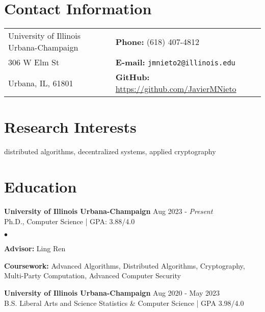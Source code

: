 \documentclass[margin,line]{res}
\newenvironment{list1}{
  \begin{list}{\ding{113}}{%
      \setlength{\itemsep}{0in}
      \setlength{\parsep}{0in} \setlength{\parskip}{0in}
      \setlength{\topsep}{0in} \setlength{\partopsep}{0in} 
      \setlength{\leftmargin}{0.17in}}}{\end{list}}
\newenvironment{list2}{
  \begin{list}{$\bullet$}{%
      \setlength{\itemsep}{0in}
      \setlength{\parsep}{0in} \setlength{\parskip}{0in}
      \setlength{\topsep}{0in} \setlength{\partopsep}{0in} 
      \setlength{\leftmargin}{0.2in}}}{\end{list}}
\begin{document}

\begin{resume}
  \section{\sc Contact Information}
  \vspace{.05in}
  \begin{tabular}{@{}p{3in}p{4in}}
    University of Illinois Urbana-Champaign & {\bf Phone:}   (618) 407-4812                       \\
    306 W Elm St                            & {\bf E-mail:}  {\tt jmnieto2@illinois.edu}          \\
    Urbana, IL, 61801                       & {\bf GitHub:} \url{https://github.com/JavierMNieto} \\
  \end{tabular}


  \section{\sc Research Interests}
  distributed algorithms, decentralized systems, applied cryptography

  \section{\sc Education}
   {\bf University of Illinois Urbana-Champaign} \hfill Aug 2023 - \emph{Present}\\
  Ph.D., Computer Science | GPA: 3.88/4.0
  \begin{list2}
    \item {\bf \small Advisor:}  Ling Ren
    \item {\bf \small Coursework:} Advanced Algorithms, Distributed Algorithms, Cryptography, Multi-Party Computation, Advanced Computer Security
  \end{list2}

  {\bf University of Illinois Urbana-Champaign} \hfill Aug 2020 - May 2023\\
  B.S. Liberal Arts and Science Statistics \& Computer Science | GPA 3.98/4.0


\end{resume}
\end{document}
